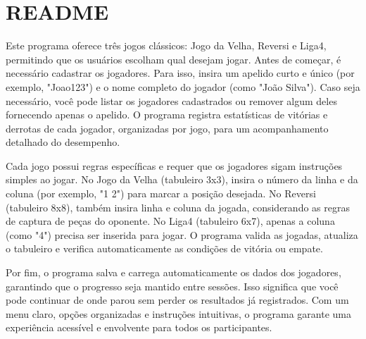 \chapter{README}
\hypertarget{md__r_e_a_d_m_e}{}\label{md__r_e_a_d_m_e}
Este programa oferece três jogos clássicos\+: Jogo da Velha, Reversi e Liga4, permitindo que os usuários escolham qual desejam jogar. Antes de começar, é necessário cadastrar os jogadores. Para isso, insira um apelido curto e único (por exemplo, "{}\+Joao123"{}) e o nome completo do jogador (como "{}\+João Silva"{}). Caso seja necessário, você pode listar os jogadores cadastrados ou remover algum deles fornecendo apenas o apelido. O programa registra estatísticas de vitórias e derrotas de cada jogador, organizadas por jogo, para um acompanhamento detalhado do desempenho.

Cada jogo possui regras específicas e requer que os jogadores sigam instruções simples ao jogar. No Jogo da Velha (tabuleiro 3x3), insira o número da linha e da coluna (por exemplo, "{}1 2"{}) para marcar a posição desejada. No Reversi (tabuleiro 8x8), também insira linha e coluna da jogada, considerando as regras de captura de peças do oponente. No Liga4 (tabuleiro 6x7), apenas a coluna (como "{}4"{}) precisa ser inserida para jogar. O programa valida as jogadas, atualiza o tabuleiro e verifica automaticamente as condições de vitória ou empate.

Por fim, o programa salva e carrega automaticamente os dados dos jogadores, garantindo que o progresso seja mantido entre sessões. Isso significa que você pode continuar de onde parou sem perder os resultados já registrados. Com um menu claro, opções organizadas e instruções intuitivas, o programa garante uma experiência acessível e envolvente para todos os participantes. 
